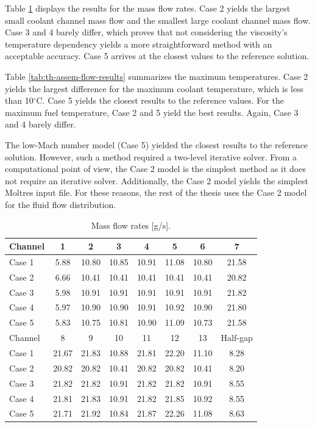 Table \ref{tab:th-assem-flow-massflow} displays the results for the mass flow rates.
Case 2 yields the largest small coolant channel mass flow and the smallest large coolant channel mass flow.
Case 3 and 4 barely differ, which proves that not considering the viscosity's temperature dependency yields a more straightforward method with an acceptable accuracy.
Case 5 arrives at the closest values to the reference solution.

Table \ref{tab:th-assem-flow-results} summarizes the maximum temperatures.
Case 2 yields the largest difference for the maximum coolant temperature, which is less than 10$^{\circ}$C.
Case 5 yields the closest results to the reference values.
For the maximum fuel temperature, Case 2 and 5 yield the best results.
Again, Case 3 and 4 barely differ.

The low-Mach number model (Case 5) yielded the closest results to the reference solution.
However, such a method required a two-level iterative solver.
From a computational point of view, the Case 2 model is the simplest method as it does not require an iterative solver.
Additionally, the Case 2 model yields the simplest Moltres input file.
For these reasons, the rest of the thesis uses the Case 2 model for the fluid flow distribution.

\begin{table}[htbp!]
  \centering
  \caption{Mass flow rates [g/s].}
  \label{tab:th-assem-flow-massflow}
  \begin{tabular}{l|ccccccc}
\toprule
Channel & 1 & 2 & 3 & 4 & 5 & 6 & 7 \\
\midrule
Case 1  & 5.88 & 10.80 & 10.85 & 10.91 & 11.08 & 10.80 & 21.58 \\
Case 2  & 6.66 & 10.41 & 10.41 & 10.41 & 10.41 & 10.41 & 20.82 \\
Case 3  & 5.98 & 10.91 & 10.91 & 10.91 & 10.91 & 10.91 & 21.82 \\
Case 4  & 5.97 & 10.90 & 10.90 & 10.91 & 10.92 & 10.90 & 21.80 \\
Case 5  & 5.83 & 10.75 & 10.81 & 10.90 & 11.09 & 10.73 & 21.58 \\
\midrule
Channel & 8 & 9 & 10 & 11 & 12 & 13 & Half-gap \\
\midrule
Case 1  & 21.67 & 21.83 & 10.88 & 21.81 & 22.20 & 11.10 & 8.28 \\
Case 2  & 20.82 & 20.82 & 10.41 & 20.82 & 20.82 & 10.41 & 8.20 \\
Case 3  & 21.82 & 21.82 & 10.91 & 21.82 & 21.82 & 10.91 & 8.55 \\
Case 4  & 21.81 & 21.83 & 10.91 & 21.82 & 21.85 & 10.92 & 8.55 \\
Case 5  & 21.71 & 21.92 & 10.84 & 21.87 & 22.26 & 11.08 & 8.63 \\
\bottomrule
\end{tabular}
\end{table}

